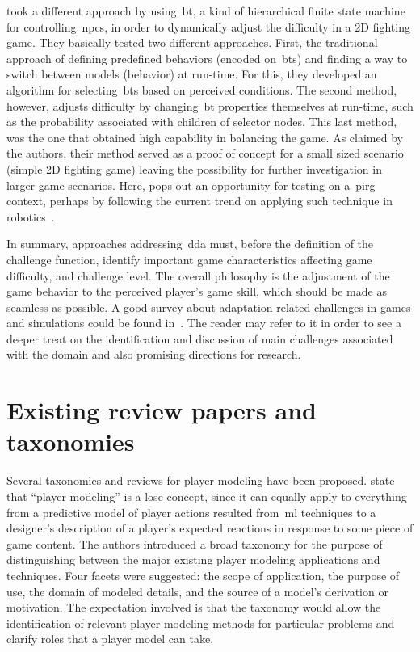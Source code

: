\cite{sejrsgaard-jacobsen_dynamic_2011} took a different approach by using~\gls{bt}, a kind of hierarchical finite state machine for controlling~\glspl{npc}, in order to dynamically adjust the difficulty in a 2D fighting game. They basically tested two different approaches. First, the traditional approach of defining predefined behaviors (encoded on~\glspl{bt}) and finding a way to switch between models (behavior) at run-time. For this, they developed an algorithm for selecting~\glspl{bt} based on perceived conditions. The second method, however, adjusts difficulty by changing~\gls{bt} properties themselves at run-time, such as the probability associated with children of selector nodes. This last method, was the one that obtained high capability in balancing the game. As claimed by the authors, their method served as a proof of concept for a small sized scenario (simple 2D fighting game) leaving the possibility for further investigation in larger game scenarios. Here, pops out an opportunity for testing on a~\gls{pirg} context, perhaps by following the current trend on applying such technique in robotics~\citep{scheper_behavior_2015, pereira_framework_2015, marzinotto_towards_2014}.

In summary, approaches addressing~\gls{dda} must, before the definition of the challenge function, identify important game characteristics affecting game difficulty, and challenge level. The overall philosophy is the adjustment of the game behavior to the perceived player's game skill, which should be made as seamless as possible. A good survey about adaptation-related challenges in games and simulations could be found in~\cite{lopes_adaptivity_2011}. The reader may refer to it in order to see a deeper treat on the identification and discussion of main challenges associated with the domain and also promising directions for research.

\section{Existing review papers and taxonomies}\label{reviews}
Several taxonomies and reviews for player modeling have been proposed. \cite{smith_inclusive_2011} state that ``player modeling'' is a lose concept, since it can equally apply to everything from a predictive model of player actions resulted from~\gls{ml} techniques to a designer's description of a player's expected reactions in response to some piece of game content. The authors introduced a broad taxonomy for the purpose of distinguishing between the major existing player modeling applications and techniques. Four facets were suggested: the scope of application, the purpose of use, the domain of modeled details, and the source of a model's derivation or motivation. The expectation involved is that the taxonomy would allow the identification of relevant player modeling methods for particular problems and clarify roles that a player model can take.

